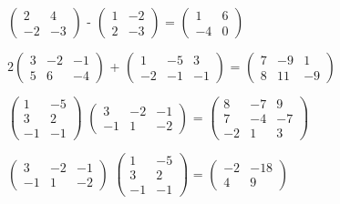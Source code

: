 \documentclass{jsarticle}
\begin{document}
	\begin{description}
		\setlength{\itemsep}{0.5cm}

		\item[(1)]
			$ \begin{pmatrix}
				2 & 4 \\
				-2 & -3
			\end{pmatrix} $
			-
			$ \begin{pmatrix}
				1 & -2 \\
				2 & -3
			\end{pmatrix} $
			=
			$ \begin{pmatrix}
				1 & 6 \\
				-4 & 0
			\end{pmatrix} $

		\item[(2)]
			$ 2 \begin{pmatrix}
				3 & -2 & -1 \\
				5 & 6 &-4
			\end{pmatrix} $
			+
			$ \begin{pmatrix}
				1 & -5 & 3 \\
				-2 & -1 & -1
			\end{pmatrix} $
			=
			$ \begin{pmatrix}
				7 & -9 & 1 \\
				8 & 11 & -9
			\end{pmatrix} $

		\item[(3)]
			$ \begin{pmatrix}
				1 & -5 \\
				3 & 2 \\
				-1 & -1
			\end{pmatrix} $
			$ \begin{pmatrix}
				3 & -2 & -1 \\
				-1 & 1 & -2
			\end{pmatrix} $
			=
			$ \begin{pmatrix}
				8 & -7 & 9 \\
				7 & -4 & -7 \\
				-2 & 1 & 3
			\end{pmatrix} $

		\item[(4)]
			$ \begin{pmatrix}
				3 & -2 & -1 \\
				-1 & 1 & -2
			\end{pmatrix} $
			$ \begin{pmatrix}
				1 & -5 \\
				3 & 2 \\
				-1 & -1
			\end{pmatrix} $
			=
			$ \begin{pmatrix}
				-2 & -18 \\
				4 & 9
			\end{pmatrix} $


\end{description}
\end{document}
